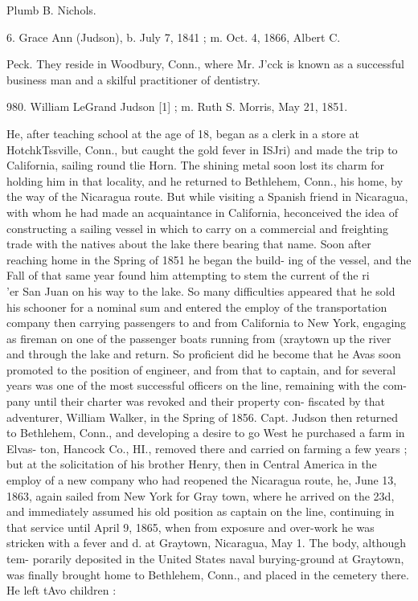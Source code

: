 Plumb B. Nichols. 

6. Grace Ann (Judson), b. July 7, 1841 ; m. Oct. 4, 1866, Albert C. 

Peck. They reside in Woodbury, Conn., where Mr. J'cck is 
known as a successful business man and a skilful practitioner 
of dentistry. 




980. William LeGrand Judson [1] ; m. Ruth S. Morris, May 21, 1851. 

He, after teaching school at the age of 18, began as a clerk in 
a store at HotchkTssville, Conn., but caught the gold fever in 
ISJri) and made the trip to California, sailing round tlie Horn. 
The shining metal soon lost its charm for holding him in that 
locality, and he returned to Bethlehem, Conn., his home, by 
the way of the Nicaragua route. But while visiting a Spanish 
friend in Nicaragua, with whom he had made an acquaintance 
in California, heconceived the idea of constructing a sailing 
vessel in which to carry on a commercial and freighting trade 
with the natives about the lake there bearing that name. Soon 
after reaching home in the Spring of 1851 he began the build- 
ing of the vessel, and the Fall of that same year found him 
attempting to stem the current of the ri\\'er San Juan on his 
way to the lake. So many difficulties appeared that he sold 
his schooner for a nominal sum and entered the employ of the 
transportation company then carrying passengers to and from 
California to New York, engaging as fireman on one of the 
passenger boats running from (xraytown up the river and 
through the lake and return. So proficient did he become 
that he Avas soon promoted to the position of engineer, and 
from that to captain, and for several years was one of the 
most successful officers on the line, remaining with the com- 
pany until their charter was revoked and their property con- 
fiscated by that adventurer, William Walker, in the Spring of 
1856. Capt. Judson then returned to Bethlehem, Conn., and 
developing a desire to go West he purchased a farm in Elvas- 
ton, Hancock Co., HI., removed there and carried on farming 
a few years ; but at the solicitation of his brother Henry, then 
in Central America in the employ of a new company who had 
reopened the Nicaragua route, he, June 13, 1863, again sailed 
from New York for Gray town, where he arrived on the 23d, 
and immediately assumed his old position as captain on the 
line, continuing in that service until April 9, 1865, when from 
exposure and over-work he was stricken with a fever and d. 
at Graytown, Nicaragua, May 1. The body, although tem- 
porarily deposited in the United States naval burying-ground 
at Graytown, was finally brought home to Bethlehem, Conn., 
and placed in the cemetery there. He left tAvo children : 

